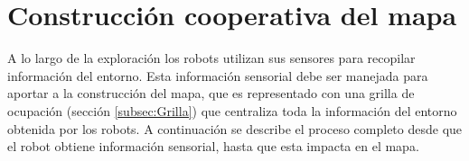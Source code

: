 \section{Construcción cooperativa del mapa}




A lo largo de la exploración los robots utilizan sus sensores para recopilar
información del entorno. Esta información sensorial debe ser manejada para
aportar a la construcción del mapa, que es representado con una grilla de
ocupación (sección \ref{subsec:Grilla}) que centraliza toda la información del
entorno obtenida por los robots. A continuación se describe el proceso completo
desde que el robot obtiene información sensorial, hasta que esta impacta en el
mapa.



